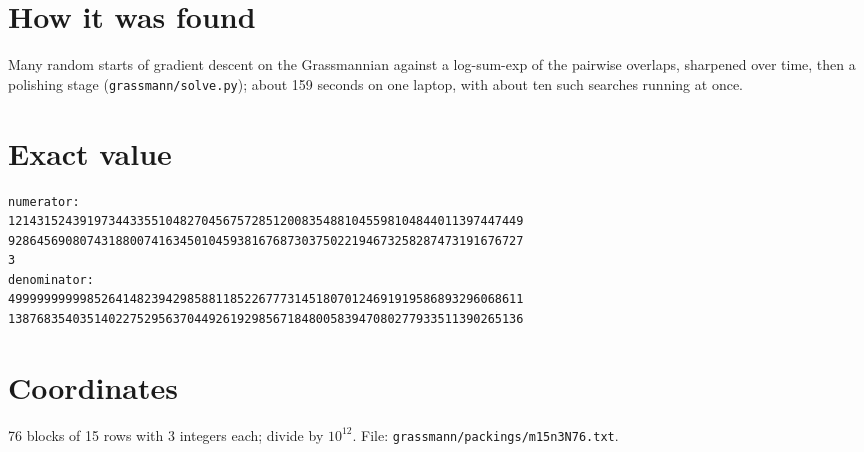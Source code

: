 \documentclass[11pt,a4paper]{article}
\begin{document}
\section{How it was found}
Many random starts of gradient descent on the Grassmannian against a log-sum-exp of the pairwise overlaps, sharpened over time, then a polishing stage (\texttt{grassmann/solve.py}); about 159 seconds on one laptop, with about ten such searches running at once.


\appendix
\section{Exact value}
{\small
\begin{verbatim}
numerator:
121431524391973443355104827045675728512008354881045598104844011397447449
928645690807431880074163450104593816768730375022194673258287473191676727
3
denominator:
499999999998526414823942985881185226777314518070124691919586893296068611
138768354035140227529563704492619298567184800583947080277933511390265136
\end{verbatim}}

\section{Coordinates}
76 blocks of 15 rows with 3 integers each; divide by $10^{12}$. File: \texttt{grassmann/packings/m15n3N76.txt}.
{\tiny
\begin{multicols}{3}
\end{multicols}}
\end{document}
